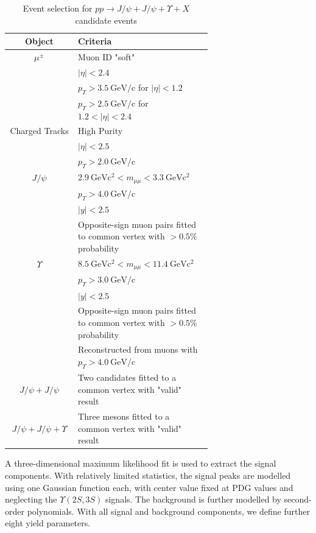 \documentclass[10pt,twocolumn]{article}
\newcommand*{\GeVc}{~\text{GeV/c}}
\newcommand*{\GeVcs}{~\text{GeV}\text{c}^2}
\begin{document}
\begin{table}[h!]
    \centering
    \caption{Event selection for $pp\to J/\psi+J/\psi+\Upsilon+X$ candidate events\\}
    \begin{tabular}{c p{0.66\linewidth}}
        \toprule
        \textbf{Object} & \textbf{Criteria} \\
        \midrule
        $\mu^\pm $ & Muon ID "soft" \\
                  & $|\eta| < 2.4$ \\
                  & $p_T > 3.5\GeVc$ for $|\eta| < 1.2$ \\
                  & $p_T > 2.5\GeVc$ for $1.2 < |\eta| < 2.4$ \\
                  \midrule
        Charged Tracks & High Purity \\
                  & $|\eta|<2.5$ \\
                  & $p_T > 2.0 \GeVc$ \\
        \midrule
        $J/\psi$ & $2.9 \GeVcs < m_{\mu\mu} < 3.3 \GeVcs$ \\
                 & $p_T > 4.0\GeVc$ \\
                 & $|y| < 2.5$ \\
                 & Opposite-sign muon pairs fitted to common vertex with $> 0.5\%$ probability \\
                 \midrule
        $\Upsilon$ & $8.5\GeVcs < m_{\mu\mu} < 11.4 \GeVcs$ \\
                 & $p_T > 3.0\GeVc$ \\
                 & $|y| < 2.5$ \\
                 & Opposite-sign muon pairs fitted to common vertex with $> 0.5\%$ probability \\
                 & Reconstructed from muons with $p_T>4.0\GeVc$ \\
                 \midrule
        $J/\psi+J/\psi$ & Two candidates fitted to a common vertex with "valid" result \\
        \midrule
        $J/\psi+J/\psi+\Upsilon$ & Three mesons fitted to a common vertex with "valid" result \\
        \bottomrule
    \end{tabular}
    \label{tab:cut_JpsiJpsiY}
\end{table}

A three-dimensional maximum likelihood fit is used to extract the signal components. With relatively limited statistics, the signal peaks are modelled using one Gaussian function each, with center value fixed at PDG values \cite{PDG2020} and neglecting the $\Upsilon(2S,3S)$ signals. The background is further modelled by second-order polynomials. With all signal and background components, we define further eight yield parameters.
\end{document}
